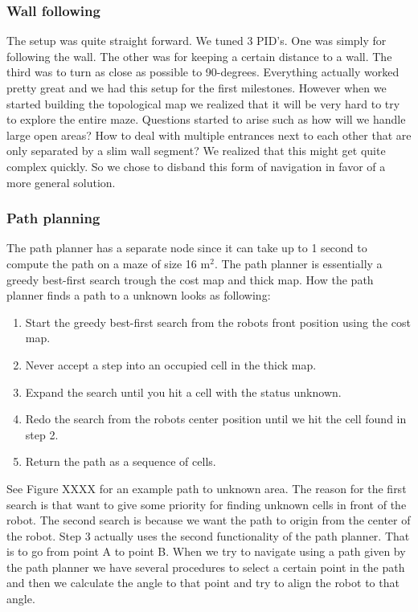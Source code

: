 \subsubsection{Wall following}
The setup was quite straight forward. We tuned 3 PID’s. One was simply for following the wall. The other was for keeping a certain distance to a wall. The third was to turn as close as possible to 90-degrees. Everything actually worked pretty great and we had this setup for the first milestones. However when we started building the topological map we realized that it will be very hard to try to explore the entire maze. Questions started to arise such as how will we handle large open areas? How to deal with multiple entrances next to each other that are only separated by a slim wall segment? We realized that this might get quite complex quickly. So we chose to disband this form of navigation in favor of a more general solution.

\subsubsection{Path planning}
The path planner has a separate node since it can take up to 1 second to compute the path on a maze of size 16 $\text{m}^2$. The path planner is essentially a greedy best-first search trough the cost map and thick map. How the path planner finds a path to a unknown looks as following:

\begin{enumerate}
\item Start the greedy best-first search from the robots front position using the cost map.
\item Never accept a step into an occupied cell in the thick map.
\item Expand the search until you hit a cell with the status unknown.
\item Redo the search from the robots center position until we hit the cell found in step 2.
\item Return the path as a sequence of cells.
\end{enumerate}

See Figure XXXX for an example path to unknown area. The reason for the first search is that want to give some priority for finding unknown cells in front of the robot. The second search is because we want the path to origin from the center of the robot. Step 3 actually uses the second functionality of the path planner. That is to go from point A to point B. When we try to navigate using a path given by the path planner we have several procedures to select a certain point in the path and then we calculate the angle to that point and try to align the robot to that angle.

